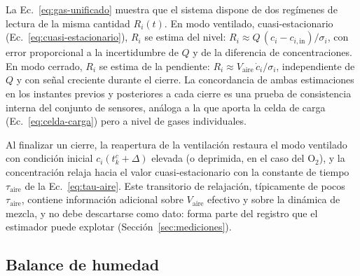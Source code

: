 \begin{remark}
\label{rem:modos-complementarios}
La Ec.~\eqref{eq:gas-unificado} muestra que el sistema dispone de dos
regímenes de lectura de la misma cantidad $R_i(t)$. En modo ventilado,
cuasi-estacionario (Ec.~\eqref{eq:cuasi-estacionario}), $R_i$ se estima del
nivel: $R_i \approx Q\,(c_i - c_{i,\mathrm{in}})/\sigma_i$, con error
proporcional a la incertidumbre de $Q$ y de la diferencia de
concentraciones. En modo cerrado, $R_i$ se estima de la pendiente:
$R_i \approx V_{\mathrm{aire}}\,\dot{c}_i/\sigma_i$, independiente de $Q$ y
con señal creciente durante el cierre. La concordancia de ambas estimaciones
en los instantes previos y posteriores a cada cierre es una prueba de
consistencia interna del conjunto de sensores, análoga a la que aporta la
celda de carga (Ec.~\eqref{eq:celda-carga}) pero a nivel de gases
individuales.
\end{remark}

\begin{remark}\label{rem:reapertura}
Al finalizar un cierre, la reapertura de la ventilación restaura el modo
ventilado con condición inicial $c_i(t_k^{c}+\Delta)$ elevada (o deprimida,
en el caso del O$_2$), y la concentración relaja hacia el valor
cuasi-estacionario con la constante de tiempo $\tau_{\mathrm{aire}}$ de la
Ec.~\eqref{eq:tau-aire}. Este transitorio de relajación, típicamente de
pocos $\tau_{\mathrm{aire}}$, contiene información adicional sobre
$V_{\mathrm{aire}}$ efectivo y sobre la dinámica de mezcla, y no debe
descartarse como dato: forma parte del registro que el estimador puede
explotar (Sección~\ref{sec:mediciones}).
\end{remark}

\subsection{Balance de humedad}
\label{sec:humedad}

